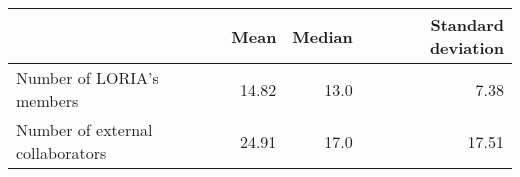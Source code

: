 \begin{tabular}{lrrr}
\toprule
{} &   Mean &  Median &  Standard deviation \\
\midrule
Number of LORIA's members        &  14.82 &    13.0 &                7.38 \\
Number of external collaborators &  24.91 &    17.0 &               17.51 \\
\bottomrule
\end{tabular}

